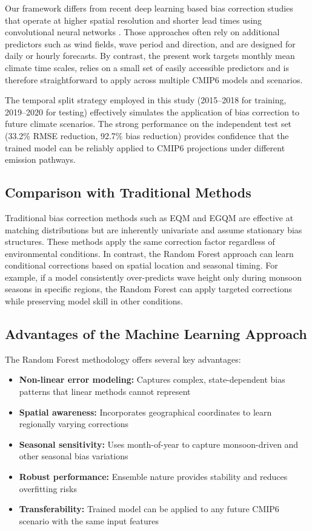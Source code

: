 \documentclass[twocolumn]{article}
\begin{document}
Our framework differs from recent deep learning based bias correction studies that operate at higher spatial resolution and shorter lead times using convolutional neural networks \cite{sun2022}. Those approaches often rely on additional predictors such as wind fields, wave period and direction, and are designed for daily or hourly forecasts. By contrast, the present work targets monthly mean climate time scales, relies on a small set of easily accessible predictors and is therefore straightforward to apply across multiple CMIP6 models and scenarios.

The temporal split strategy employed in this study (2015--2018 for training, 2019--2020 for testing) effectively simulates the application of bias correction to future climate scenarios. The strong performance on the independent test set (33.2\% RMSE reduction, 92.7\% bias reduction) provides confidence that the trained model can be reliably applied to CMIP6 projections under different emission pathways.

\subsection{Comparison with Traditional Methods}

Traditional bias correction methods such as EQM and EGQM are effective at matching distributions but are inherently univariate and assume stationary bias structures. These methods apply the same correction factor regardless of environmental conditions. In contrast, the Random Forest approach can learn conditional corrections based on spatial location and seasonal timing. For example, if a model consistently over-predicts wave height only during monsoon seasons in specific regions, the Random Forest can apply targeted corrections while preserving model skill in other conditions.

\subsection{Advantages of the Machine Learning Approach}

The Random Forest methodology offers several key advantages:
\begin{itemize}
    \item \textbf{Non-linear error modeling:} Captures complex, state-dependent bias patterns that linear methods cannot represent
    \item \textbf{Spatial awareness:} Incorporates geographical coordinates to learn regionally varying corrections
    \item \textbf{Seasonal sensitivity:} Uses month-of-year to capture monsoon-driven and other seasonal bias variations
    \item \textbf{Robust performance:} Ensemble nature provides stability and reduces overfitting risks
    \item \textbf{Transferability:} Trained model can be applied to any future CMIP6 scenario with the same input features
\end{itemize}
\end{document}
